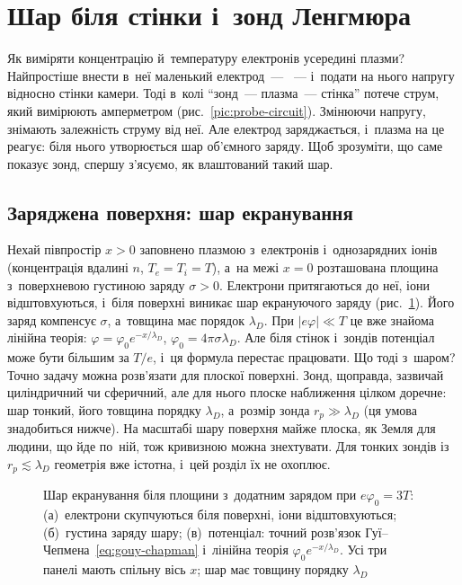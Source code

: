 \section{Шар біля стінки і~зонд Ленгмюра}\label{sec:bohm-sheath}\label{sec:debye-layer}

Як виміряти концентрацію й~температуру електронів усередині плазми? Найпростіше внести в~неї
маленький електрод~--- ~--- і~подати на нього напругу відносно стінки камери. Тоді в~колі
\enquote{зонд~--- плазма~--- стінка} потече струм, який вимірюють амперметром (рис.~\ref{pic:probe-circuit}).
Змінюючи напругу, знімають залежність струму від неї. Але електрод
заряджається, і~плазма на це реагує: біля нього утворюється шар об'ємного заряду. Щоб зрозуміти, що саме
показує зонд, спершу з'ясуємо, як влаштований такий шар.

\subsection*{Заряджена поверхня: шар екранування}
Нехай півпростір $x>0$ заповнено плазмою з~електронів і~однозарядних іонів (концентрація
вдалині $n$, $T_e=T_i=T$), а~на межі $x=0$ розташована площина з~поверхневою густиною
заряду $\sigma>0$. Електрони притягаються до неї, іони відштовхуються, і~біля поверхні виникає
шар екрануючого заряду (рис.~\ref{pic:debye-layer}). Його заряд компенсує $\sigma$, а~товщина
має порядок $\lambda_D$. При $|e\varphi|\ll T$ це вже знайома лінійна теорія:
$\varphi=\varphi_0e^{-x/\lambda_D}$, $\varphi_0=4\pi\sigma\lambda_D$. Але біля стінок і~зондів потенціал
може бути більшим за $T/e$, і~ця формула перестає працювати. Що тоді з~шаром? Точно
задачу можна розв'язати для плоскої поверхні. Зонд, щоправда, зазвичай циліндричний чи сферичний, але для нього
плоске наближення цілком доречне: шар тонкий, його товщина порядку $\lambda_D$, а~розмір зонда
$r_p\gg\lambda_D$ (ця умова знадобиться нижче). На масштабі шару поверхня майже плоска, як Земля для людини,
що йде по~ній, тож кривизною можна знехтувати. Для тонких зондів із~$r_p\lesssim\lambda_D$ геометрія вже
істотна, і~цей розділ їх не охоплює.

\begin{figure}[ht]\centering
	\caption{Шар екранування біля площини з~додатним зарядом при $e\varphi_0=3T$: (а)~електрони скупчуються
	біля поверхні, іони відштовхуються; (б)~густина заряду шару; (в)~потенціал: точний розв'язок
	Гуї--Чепмена~\eqref{eq:gouy-chapman} і~лінійна теорія $\varphi_0e^{-x/\lambda_D}$. Усі три панелі
	мають спільну вісь $x$; шар має товщину порядку $\lambda_D$}
	\label{pic:debye-layer}
\end{figure}

